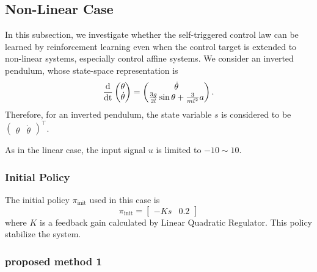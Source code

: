 \documentclass[english, dvipdfmx]{ampmt}             %
\newcommand{\odif}[2]{\frac{\rm{d}#1}{\rm{d}#2}}
\begin{document}
\subsection{Non-Linear Case}
In this subsection, we investigate whether the self-triggered control law can be learned by reinforcement learning even when the control target is extended to non-linear systems, especially control affine systems. We consider an inverted pendulum, whose state-space representation is
\begin{equation}
	\odif{}{t}\begin{pmatrix}\theta \\ \dot{\theta}\end{pmatrix} = 
		\begin{pmatrix}\dot{\theta} \\ \frac{3g}{2l}\sin{\theta} + \frac{3}{ml^2}a \end{pmatrix} \label{pendulum}.
\end{equation}
Therefore, for an inverted pendulum, the state variable $s$ is considered to be $\begin{pmatrix}\theta & \dot{\theta}\end{pmatrix}^{\top}$.
\par
As in the linear case, the input signal $u$ is limited to $-10 \sim 10$.

\subsubsection{Initial Policy}
The initial policy $\pi_{\textrm{init}}$ used in this case is
\begin{equation}
	\pi_{\textrm{init}} = \begin{bmatrix}-Ks&0.2\end{bmatrix}
\end{equation}
where $K$ is a feedback gain calculated by Linear Quadratic Regulator. This policy stabilize the system.

\subsubsection{proposed method 1}
\end{document}
